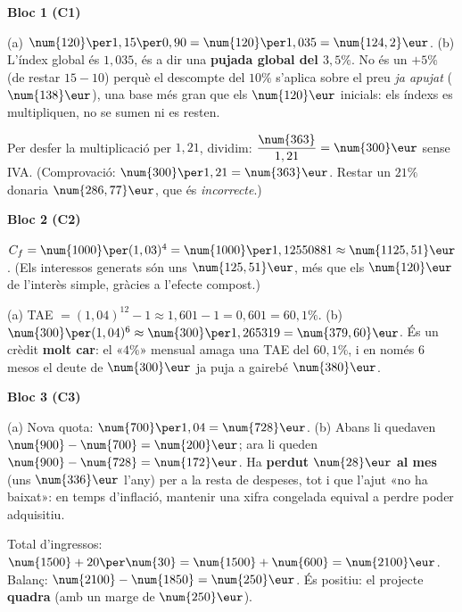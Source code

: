 \newpage
\begin{solucions}

\noindent\textbf{Bloc 1 (C1)}
\begin{sollist}
  \item (a) $\num{120}\per 1,15\per 0,90=\num{120}\per 1,035=\num{124,2}\eur$. \quad
        (b) L'índex global és $1,035$, és a dir una \textbf{pujada global del $3,5\%$}.
        No és un $+5\%$ (de restar $15-10$) perquè el descompte del $10\%$ s'aplica
        sobre el preu \emph{ja apujat} ($\num{138}\eur$), una base més gran que els
        $\num{120}\eur$ inicials: els índexs es multipliquen, no se sumen ni es resten.
  \item Per desfer la multiplicació per $1,21$, dividim:
        $\dfrac{\num{363}}{1,21}=\num{300}\eur$ sense IVA. (Comprovació:
        $\num{300}\per 1,21=\num{363}\eur$. Restar un $21\%$ donaria $\num{286,77}\eur$,
        que és \emph{incorrecte}.)
\end{sollist}

\noindent\textbf{Bloc 2 (C2)}
\begin{sollist}\setcounter{enumi}{2}
  \item $C_f=\num{1000}\per (1,03)^4=\num{1000}\per 1,12550881\approx\num{1125,51}\eur$.
        (Els interessos generats són uns $\num{125,51}\eur$, més que els $\num{120}\eur$
        de l'interès simple, gràcies a l'efecte compost.)
  \item (a) TAE $=(1,04)^{12}-1\approx 1,601-1=0,601=60,1\%$. \quad
        (b) $\num{300}\per (1,04)^6\approx\num{300}\per 1,265319=\num{379,60}\eur$. És un
        crèdit \textbf{molt car}: el «$4\%$» mensual amaga una TAE del $60,1\%$, i en
        només $6$ mesos el deute de $\num{300}\eur$ ja puja a gairebé $\num{380}\eur$.
\end{sollist}

\noindent\textbf{Bloc 3 (C3)}
\begin{sollist}\setcounter{enumi}{4}
  \item (a) Nova quota: $\num{700}\per 1,04=\num{728}\eur$. \quad
        (b) Abans li quedaven $\num{900}-\num{700}=\num{200}\eur$; ara li queden
        $\num{900}-\num{728}=\num{172}\eur$. Ha \textbf{perdut $\num{28}\eur$ al mes}
        (uns $\num{336}\eur$ l'any) per a la resta de despeses, tot i que l'ajut «no ha
        baixat»: en temps d'inflació, mantenir una xifra congelada equival a perdre
        poder adquisitiu.
  \item Total d'ingressos: $\num{1500}+20\per\num{30}=\num{1500}+\num{600}=\num{2100}\eur$.
        Balanç: $\num{2100}-\num{1850}=\num{250}\eur$. És positiu: el projecte
        \textbf{quadra} (amb un marge de $\num{250}\eur$).
\end{sollist}

\end{solucions}


